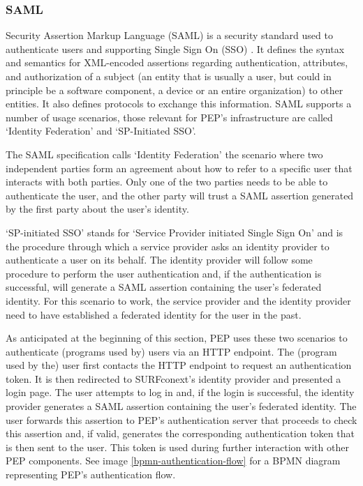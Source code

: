 \documentclass{report}
\begin{document}
\subsubsection{SAML}
Security Assertion Markup Language (SAML) is a security standard used to authenticate users and supporting Single Sign On (SSO) \cite{sstc-saml-core-errata-2.0-wd-07}. It defines
the syntax and semantics for XML-encoded assertions regarding authentication, attributes, and authorization of a subject (an entity that is usually a user, but could in principle
be a software component, a device or an entire organization) to other entities. It also defines protocols to exchange this information. SAML supports a number of usage scenarios, those 
relevant for PEP's infrastructure are called \enquote*{Identity Federation} and \enquote*{SP-Initiated SSO}. \par
The SAML specification calls \enquote*{Identity Federation} the scenario where two independent parties form an agreement about how to refer to a specific user that interacts with both
parties. Only one of the two parties needs to be able to authenticate the user, and the other party will trust a SAML assertion generated by the first party about the user's identity. \par
\enquote*{SP-initiated SSO} stands for \enquote*{Service Provider initiated Single Sign On} and is the procedure through which a service provider asks an identity provider to authenticate a user on
its behalf. The identity provider will follow some procedure to perform the user authentication and, if the authentication is successful, will generate a SAML assertion containing
the user's federated identity. For this scenario to work, the service provider and the identity provider need to have established a federated identity for the user in the past.\par
As anticipated at the beginning of this section, PEP uses these two scenarios to authenticate (programs used by) users via an HTTP endpoint. The (program used by the) user first contacts 
the HTTP endpoint to request an authentication token. It is then redirected to SURFconext's identity provider and presented a login page. The user attempts to log in and, if the login is 
successful, the identity provider generates a SAML assertion containing the user's federated identity. The user forwards this assertion to PEP's authentication server that proceeds to 
check this assertion and, if valid, generates the corresponding authentication token that is then sent to the user. This token is used during further interaction with other PEP 
components. See image \ref{bpmn-authentication-flow} for a BPMN diagram representing PEP's authentication flow.
\end{document}
